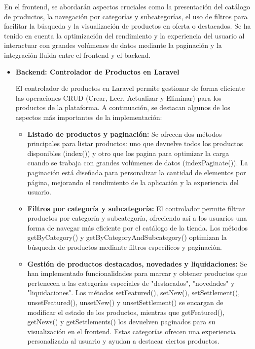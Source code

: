 \vspace{0.5cm}

En el frontend, se abordarán aspectos cruciales como la presentación del catálogo de productos, la navegación por categorías y subcategorías, el uso de filtros para facilitar la búsqueda y la visualización de productos en oferta o destacados. Se ha tenido en cuenta la optimización del rendimiento y la experiencia del usuario al interactuar con grandes volúmenes de datos mediante la paginación y la integración fluida entre el frontend y el backend.

\begin{itemize}
    \item \textbf{Backend: Controlador de Productos en Laravel} 

    El controlador de productos en Laravel permite gestionar de forma eficiente las operaciones CRUD (Crear, Leer, Actualizar y Eliminar) para los productos de la plataforma. A continuación, se destacan algunos de los aspectos más importantes de la implementación:

    \begin{itemize}
        \item \textbf{Listado de productos y paginación: }Se ofrecen dos métodos principales para listar productos: uno que devuelve todos los productos disponibles (index()) y otro que los pagina para optimizar la carga cuando se trabaja con grandes volúmenes de datos (indexPaginate()). La paginación está diseñada para personalizar la cantidad de elementos por página, mejorando el rendimiento de la aplicación y la experiencia del usuario.

         \item \textbf{Filtros por categoría y subcategoría: }El controlador permite filtrar productos por categoría y subcategoría, ofreciendo así a los usuarios una forma de navegar más eficiente por el catálogo de la tienda. Los métodos getByCategory() y getByCategoryAndSubcategory() optimizan la búsqueda de productos mediante filtros específicos y paginación.

         \item \textbf{Gestión de productos destacados, novedades y liquidaciones: }Se han implementado funcionalidades para marcar y obtener productos que pertenecen a las categorías especiales de "destacados", "novedades" y "liquidaciones". Los métodos setFeatured(), setNew(), setSettlement(), unsetFeatured(), unsetNew() y unsetSettlement() se encargan de modificar el estado de los productos, mientras que getFeatured(), getNews() y getSettlements() los devuelven paginados para su visualización en el frontend. Estas categorías ofrecen una experiencia personalizada al usuario y ayudan a destacar ciertos productos.


\end{itemize}
\end{itemize}
